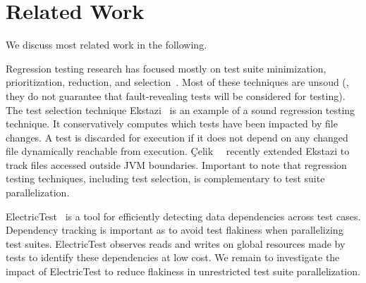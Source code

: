 \section{Related Work}
\label{sec:related}
We discuss most related work in the following.


Regression testing research has focused
mostly on test suite minimization, prioritization, reduction, and
selection~\cite{yoo-harman-stvr2012,soetens-etal-2016}.  Most of these
techniques are unsoud (\ie{}, they do not guarantee that
fault-revealing tests will be considered for testing).  The test
selection technique Ekstazi~\cite{ekstazi-web,gligoric-etal-issta2015}
is an example of a sound regression testing technique. It
conservatively computes which tests have been impacted by file
changes.  A test is discarded for execution if it does not depend on
any changed file dynamically reachable from execution. \c{C}elik~\etal{}~\cite{celik-etal-fse2017} recently extended
Ekstazi to track files accessed outside JVM boundaries.  Important to
note that regression testing techniques, including test selection, is
complementary to test suite parallelization.


ElectricTest~\cite{bell-etal-esecfse2015} is a tool for efficiently
detecting data dependencies across test cases.  Dependency tracking is
important as to avoid test flakiness when parallelizing test
suites. ElectricTest observes reads and writes on global resources
made by tests to identify these dependencies at low cost. We remain to
investigate the impact of ElectricTest to reduce flakiness in
unrestricted test suite parallelization.


